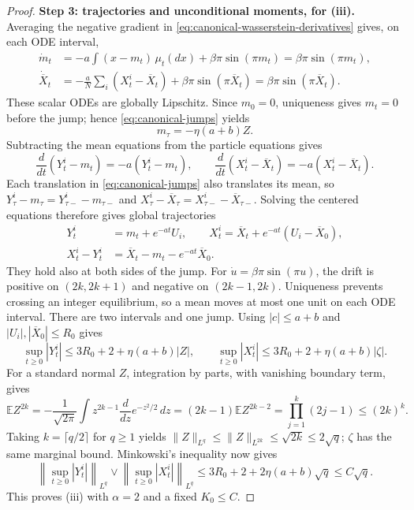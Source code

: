 \begin{proof}
\par\noindent\textbf{Step 3: trajectories and unconditional moments, for (iii).}
Averaging the negative gradient in \eqref{eq:canonical-wasserstein-derivatives}
gives, on each ODE interval,
\begin{equation}
 \begin{aligned}
 \dot m_t&=-a\int(x-m_t)\,\mu_t(dx)+\beta\pi\sin(\pi m_t)
                =\beta\pi\sin(\pi m_t),\\
 \dot{\overline X}_t&=-\frac aN\sum_i(X_t^i-\overline X_t)
                +\beta\pi\sin(\pi\overline X_t)
                =\beta\pi\sin(\pi\overline X_t).
 \end{aligned}
 \label{eq:canonical-mean-equations}
\end{equation}
These scalar ODEs are globally Lipschitz. Since $m_0=0$, uniqueness
gives $m_t=0$ before the jump; hence \eqref{eq:canonical-jumps} yields
\begin{equation}
 m_\tau=-\eta(a+b)Z.
 \label{eq:canonical-population-jump-mean}
\end{equation}
Subtracting the mean equations from the particle equations gives
\[
 \frac d{dt}(Y_t^i-m_t)=-a(Y_t^i-m_t),\qquad
 \frac d{dt}(X_t^i-\overline X_t)=-a(X_t^i-\overline X_t).
\]
Each translation in \eqref{eq:canonical-jumps} also translates its mean,
so $Y_\tau^i-m_\tau=Y_{\tau-}^i-m_{\tau-}$ and
$X_\tau^i-\overline X_\tau=X_{\tau-}^i-\overline X_{\tau-}$.
Solving the centered equations therefore gives global trajectories
\begin{equation}
 \begin{split}
 Y_t^i&=m_t+e^{-at}U_i,\qquad
 X_t^i=\overline X_t+e^{-at}(U_i-\overline X_0),\\
 X_t^i-Y_t^i&=\overline X_t-m_t-e^{-at}\overline X_0.
 \end{split}
 \label{eq:canonical-trajectories}
\end{equation}
They hold also at both sides of the jump.
For $\dot u=\beta\pi\sin(\pi u)$, the drift is positive on
$(2k,2k+1)$ and negative on $(2k-1,2k)$.
Uniqueness prevents crossing an integer equilibrium, so a mean moves
at most one unit on each ODE interval. There are two intervals and one
jump. Using $|c|\le a+b$ and $|U_i|,|\overline X_0|\le R_0$ gives
\[
 \sup_{t\ge0}|Y_t^i|\le3R_0+2+\eta(a+b)|Z|,\qquad
 \sup_{t\ge0}|X_t^i|\le3R_0+2+\eta(a+b)|\zeta|.
\]
For a standard normal $Z$, integration by parts, with vanishing boundary
term, gives
\[
 \mathbb E Z^{2k}
 =-\frac1{\sqrt{2\pi}}\int z^{2k-1}\frac d{dz}e^{-z^2/2}\,dz
 =(2k-1)\mathbb E Z^{2k-2}
 =\prod_{j=1}^k(2j-1)\le(2k)^k.
\]
Taking $k=\lceil q/2\rceil$ for $q\ge1$ yields
$\|Z\|_{L^q}\le\|Z\|_{L^{2k}}\le\sqrt{2k}\le2\sqrt q$;
$\zeta$ has the same marginal bound.
Minkowski's inequality now gives
\[
 \left\|\sup_{t\ge0}|Y_t^i|\right\|_{L^q}
 \vee\left\|\sup_{t\ge0}|X_t^i|\right\|_{L^q}
 \le3R_0+2+2\eta(a+b)\sqrt q\le C\sqrt q.
\]
This proves (iii) with $\alpha=2$ and a fixed $K_0\le C$.


\end{proof}
